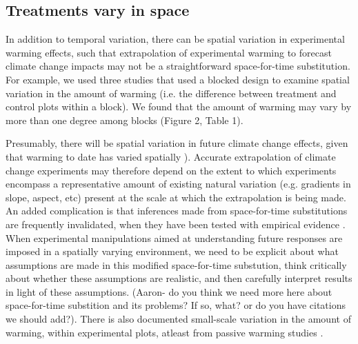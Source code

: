 \documentclass{article}
\begin{document}
\subsection* {Treatments vary in space}
In addition to temporal variation, there can be spatial variation in experimental warming effects, such that extrapolation of experimental warming to forecast climate change impacts may not be a straightforward space-for-time substitution. For example, we used three studies that used a blocked design to examine spatial variation in the amount of warming (i.e. the difference between treatment and control plots within a block). We found that the amount of warming may vary by more than one degree among blocks (Figure 2, Table 1).
\par Presumably, there will be spatial variation in future climate change effects, given that warming to date has varied spatially \citep{ipcc2013}).  Accurate extrapolation of climate change experiments may therefore depend on the extent to which experiments encompass a representative amount of existing natural variation (e.g. gradients in slope, aspect, etc) present at the scale at which the extrapolation is being made. An added complication is that inferences made from space-for-time substitutions are frequently invalidated, when they have been tested with empirical evidence \citep{johnson2008}. When experimental manipulations aimed at understanding future responses are imposed in a spatially varying environment, we need to be explicit about what assumptions are made in this modified space-for-time substution, think critically about whether these assumptions are realistic, and then carefully interpret results in light of these assumptions. (Aaron- do you think we need more here about space-for-time substition and its problems? If so, what? or do you have citations we should add?). There is also documented small-scale variation in the amount of warming, within experimental plots, atleast from passive warming studies \citep {marion1997}.
\end{document}

